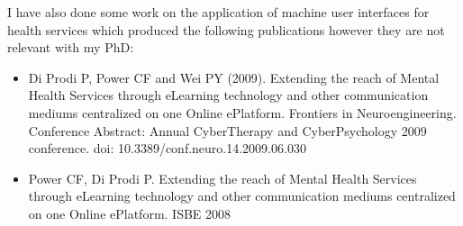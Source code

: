 I have also done some work on the application of machine user interfaces for
health services which produced the following publications however they are not relevant
with my PhD:
\begin{itemize}
\item Di Prodi P, Power CF and Wei PY (2009). Extending the reach of Mental
Health Services through eLearning technology and other communication mediums
centralized on one Online ePlatform. Frontiers in Neuroengineering. Conference
Abstract: Annual CyberTherapy and CyberPsychology 2009 conference. doi:
10.3389/conf.neuro.14.2009.06.030

\item Power CF, Di Prodi P. Extending the reach of Mental Health Services
through eLearning technology and other communication mediums centralized on one
Online ePlatform. ISBE 2008

\end{itemize}
